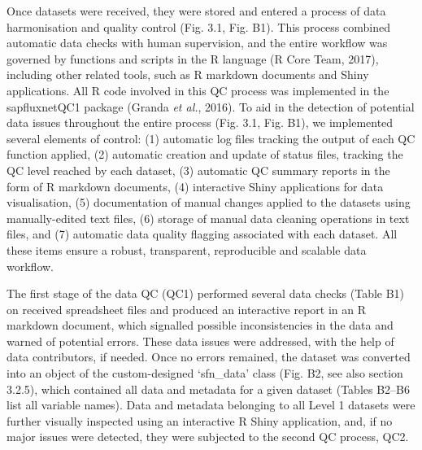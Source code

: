 \documentclass[11pt,twoside]{reedthesis}
\begin{document}
Once datasets were received, they were stored and entered a process of
data harmonisation and quality control (Fig. 3.1, Fig. B1). This process
combined automatic data checks with human supervision, and the entire
workflow was governed by functions and scripts in the R language (R Core
Team, 2017), including other related tools, such as R markdown documents
and Shiny applications. All R code involved in this QC process was
implemented in the sapfluxnetQC1 package (Granda \emph{et al.}, 2016).
To aid in the detection of potential data issues throughout the entire
process (Fig. 3.1, Fig. B1), we implemented several elements of control:
(1) automatic log files tracking the output of each QC function applied,
(2) automatic creation and update of status files, tracking the QC level
reached by each dataset, (3) automatic QC summary reports in the form of
R markdown documents, (4) interactive Shiny applications for data
visualisation, (5) documentation of manual changes applied to the
datasets using manually-edited text files, (6) storage of manual data
cleaning operations in text files, and (7) automatic data quality
flagging associated with each dataset. All these items ensure a robust,
transparent, reproducible and scalable data workflow.\par

The first stage of the data QC (QC1) performed several data checks
(Table B1) on received spreadsheet files and produced an interactive
report in an R markdown document, which signalled possible
inconsistencies in the data and warned of potential errors. These data
issues were addressed, with the help of data contributors, if needed.
Once no errors remained, the dataset was converted into an object of the
custom-designed `sfn\_data' class (Fig. B2, see also section 3.2.5),
which contained all data and metadata for a given dataset (Tables B2--B6
list all variable names). Data and metadata belonging to all Level 1
datasets were further visually inspected using an interactive R Shiny
application, and, if no major issues were detected, they were subjected
to the second QC process, QC2.\par

\vspace*{\fill} \newpage
\end{document}
